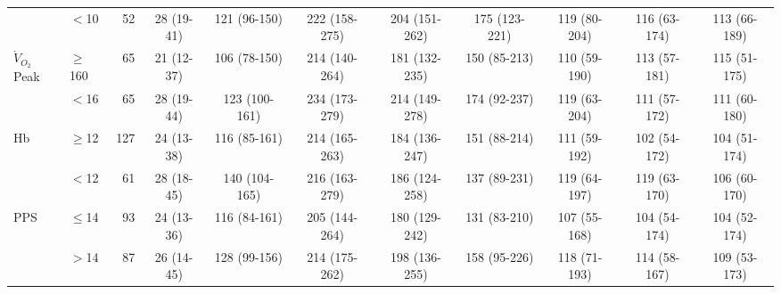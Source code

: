 \begin{sidewaystable}[p]
\begin{tabular}{|llr | cccccccc|}
		                    & $<$10     &  52 & 28 (19-41) & 121 (96-150)  & 222 (158-275) & 204 (151-262) & 175 (123-221) & 119 (80-204)  & 116 (63-174) & 113 (66-189)  \\
		$\dot{V}_{O_2}$Peak & $\geq$160 &  65 & 21 (12-37) & 106 (78-150)  & 214 (140-264) & 181 (132-235) & 150 (85-213)  & 110 (59-190)  & 113 (57-181) & 115 (51-175)  \\
		                    & $<$16     &  65 & 28 (19-44) & 123 (100-161) & 234 (173-279) & 214 (149-278) & 174 (92-237)  & 119 (63-204)  & 111 (57-172) & 111 (60-180)  \\
		Hb                  & $\geq$12  & 127 & 24 (13-38) & 116 (85-161)  & 214 (165-263) & 184 (136-247) & 151 (88-214)  & 111 (59-192)  & 102 (54-172) & 104 (51-174)  \\
		                    & $<$12     &  61 & 28 (18-45) & 140 (104-165) & 216 (163-279) & 186 (124-258) & 137 (89-231)  & 119 (64-197)  & 119 (63-170) & 106 (60-170)  \\
		PPS                 & $\leq$14  &  93 & 24 (13-36) & 116 (84-161)  & 205 (144-264) & 180 (129-242) & 131 (83-210)  & 107 (55-168)  & 104 (54-174) & 104 (52-174)  \\
		                    & $>$14     &  87 & 26 (14-45) & 128 (99-156)  & 214 (175-262) & 198 (136-255) & 158 (95-226)  & 118 (71-193)  & 114 (58-167) & 109 (53-173)  \\ \hline
	\end{tabular}	
\end{sidewaystable}































